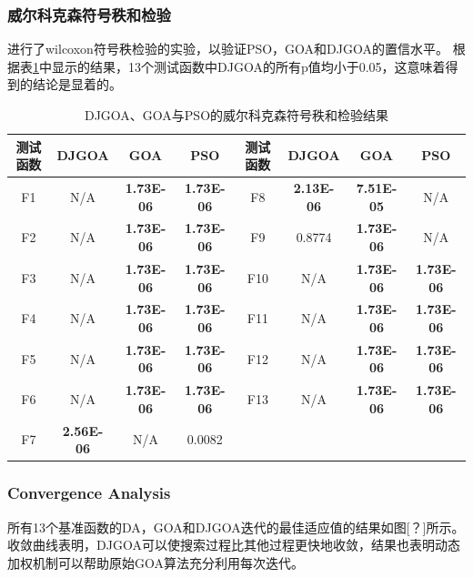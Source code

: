 \subsubsection{威尔科克森符号秩和检验}
进行了wilcoxon符号秩检验的实验，以验证PSO，GOA和DJGOA的置信水平。 根据表\ref{tab:wilcoxon_signed_rank_test_DJGOA}中显示的结果，13个测试函数中DJGOA的所有p值均小于0.05，这意味着得到的结论是显着的。
\begin{table}[!htbp]
    \centering
    \caption{DJGOA、GOA与PSO的威尔科克森符号秩和检验结果}
    \label{tab:wilcoxon_signed_rank_test_DJGOA}
    \renewcommand\arraystretch{1.5} 
\begin{tabular}{c c c c || c c c c}
  \hline
  测试函数 & DJGOA & GOA & PSO &测试函数 & DJGOA & GOA & PSO\\
  \hline
  F1 & N/A & \textbf{1.73E-06}&\textbf{1.73E-06}&F8 & \textbf{2.13E-06} & \textbf{7.51E-05}&N/A \\
  \hline
  F2 & N/A & \textbf{1.73E-06}&\textbf{1.73E-06}&F9 & 0.8774 &\textbf{1.73E-06} &N/A \\
  \hline
  F3 & N/A & \textbf{1.73E-06}&\textbf{1.73E-06}&F10 & N/A & \textbf{1.73E-06}&\textbf{1.73E-06} \\
  \hline
  F4 & N/A & \textbf{1.73E-06}&\textbf{1.73E-06}&F11 & N/A & \textbf{1.73E-06}&\textbf{1.73E-06} \\
  \hline
  F5 & N/A & \textbf{1.73E-06}&\textbf{1.73E-06}&F12 & N/A & \textbf{1.73E-06}&\textbf{1.73E-06} \\
  \hline
  F6 & N/A & \textbf{1.73E-06}&\textbf{1.73E-06}&F13 & N/A & \textbf{1.73E-06}&\textbf{1.73E-06} \\
  \hline
  F7 & \textbf{2.56E-06} & N/A&0.0082&  &   &  &  \\
  \hline
  
  \hline
\end{tabular}
\end{table}


\subsubsection{Convergence Analysis}
所有13个基准函数的DA，GOA和DJGOA迭代的最佳适应值的结果如图[？]所示。 收敛曲线表明，DJGOA可以使搜索过程比其他过程更快地收敛，结果也表明动态加权机制可以帮助原始GOA算法充分利用每次迭代。


